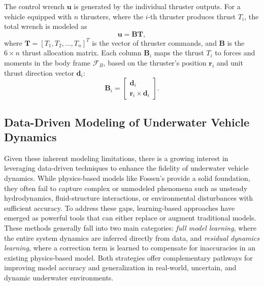 The control wrench \(\mathbf{u}\) is generated by the individual thruster outputs. For a vehicle equipped with \(n\) thrusters, where the \(i\)-th thruster produces thrust \(T_i\), the total wrench is modeled as
\begin{equation}
    \mathbf{u} = \mathbf{B} \boldsymbol{T},
\end{equation}
where \(\boldsymbol{T} = [T_1, T_2, \ldots, T_n]^T\) is the vector of thruster commands, and \(\mathbf{B}\) is the \(6 \times n\) thrust allocation matrix. Each column \(\mathbf{B}_i\) maps the thrust \(T_i\) to forces and moments in the body frame \(\mathcal{F}_B\), based on the thruster’s position \(\boldsymbol{r}_i\) and unit thrust direction vector \(\boldsymbol{d}_i\):
\begin{equation}
    \mathbf{B}_i = \begin{bmatrix} \boldsymbol{d}_i \\ \boldsymbol{r}_i \times \boldsymbol{d}_i \end{bmatrix}.
\end{equation}


\subsection{Data-Driven Modeling of Underwater Vehicle Dynamics}
Given these inherent modeling limitations, there is a growing interest in leveraging data-driven techniques to enhance the fidelity of underwater vehicle dynamics. While physics-based models like Fossen’s provide a solid foundation, they often fail to capture complex or unmodeled phenomena such as unsteady hydrodynamics, fluid-structure interactions, or environmental disturbances with sufficient accuracy. To address these gaps, learning-based approaches have emerged as powerful tools that can either replace or augment traditional models. These methods generally fall into two main categories: \textit{full model learning}, where the entire system dynamics are inferred directly from data, and \textit{residual dynamics learning}, where a correction term is learned to compensate for inaccuracies in an existing physics-based model. Both strategies offer complementary pathways for improving model accuracy and generalization in real-world, uncertain, and dynamic underwater environments.



